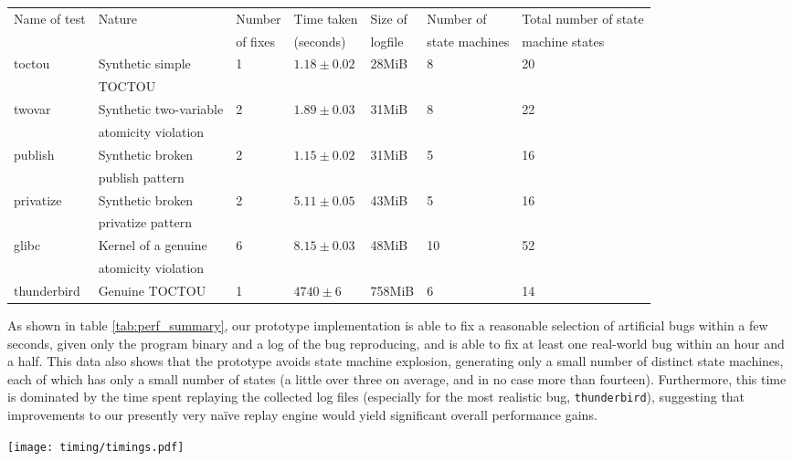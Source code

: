 \documentclass[10pt,twocolumn,preprint,natbib,authoryear]{sigplanconf}
\begin{document}
\begin{table*}
\begin{tabular}{lllllll}
Name of test & Nature & Number & Time taken & Size of & Number of & Total number of state\\
 & & of fixes & (seconds) & logfile & state machines & machine states\\
\hline
toctou & Synthetic simple & 1 & $1.18 \pm 0.02$ & 28MiB & 8 & 20\\
       & TOCTOU & & & \\
twovar & Synthetic two-variable & 2 & $1.89 \pm 0.03$ & 31MiB & 8 & 22\\
       & atomicity violation &&&\\
publish & Synthetic broken & 2 & $1.15 \pm 0.02$ & 31MiB & 5 & 16 \\
        & publish pattern & & & \\
privatize & Synthetic broken & 2 & $5.11 \pm 0.05$ & 43MiB & 5 & 16 \\
          & privatize pattern & & & \\
\hline
glibc & Kernel of a genuine & 6 & $8.15 \pm 0.03$ & 48MiB & 10 & 52\\
      & atomicity violation & & & \\
\hline
thunderbird & Genuine TOCTOU & 1 & $4740 \pm 6$ & 758MiB & 6 & 14
\end{tabular}
\caption{Summary of results obtained from running the fix generating
  tool on a single log file collected from each bug.  Timing
  information is mean and standard deviation from five runs.}
\label{tab:perf_summary}
\end{table*}

As shown in table \ref{tab:perf_summary}, our prototype implementation
is able to fix a reasonable selection of artificial bugs within a few
seconds, given only the program binary and a log of the bug
reproducing, and is able to fix at least one real-world bug within an
hour and a half.  This data also shows that the prototype avoids state
machine explosion, generating only a small number of distinct state
machines, each of which has only a small number of states (a little
over three on average, and in no case more than fourteen).
Furthermore, this time is dominated by the time spent replaying the
collected log files (especially for the most realistic bug,
\verb|thunderbird|), suggesting that improvements to our presently
very na\"ive replay engine would yield significant overall performance
gains.

\begin{figure*}
\texttt{[image: timing/timings.pdf]}
\caption{Breakdown of how long the various phases take, as fractions
  of the entire fix-generating process.  Mean and standard deviation
  from five runs on a single log file for each bug.}
\label{fig:phasedistribution}
\end{figure*}
\end{document}
